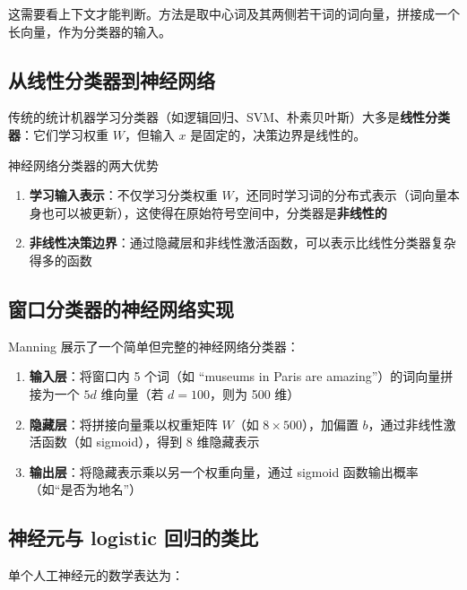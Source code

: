 \documentclass[a4paper]{article}
\begin{document}
这需要看上下文才能判断。方法是取中心词及其两侧若干词的词向量，拼接成一个长向量，作为分类器的输入。

\subsection{从线性分类器到神经网络}

传统的统计机器学习分类器（如逻辑回归、SVM、朴素贝叶斯）大多是\textbf{线性分类器}：它们学习权重 $W$，但输入 $x$ 是固定的，决策边界是线性的。

\begin{importantbox}{神经网络分类器的两大优势}
\begin{enumerate}
    \item \textbf{学习输入表示}：不仅学习分类权重 $W$，还同时学习词的分布式表示（词向量本身也可以被更新），这使得在原始符号空间中，分类器是\textbf{非线性的}
    \item \textbf{非线性决策边界}：通过隐藏层和非线性激活函数，可以表示比线性分类器复杂得多的函数
\end{enumerate}
\end{importantbox}

\subsection{窗口分类器的神经网络实现}

Manning 展示了一个简单但完整的神经网络分类器：

\begin{enumerate}
    \item \textbf{输入层}：将窗口内 5 个词（如 ``museums in Paris are amazing''）的词向量拼接为一个 $5d$ 维向量（若 $d = 100$，则为 500 维）
    \item \textbf{隐藏层}：将拼接向量乘以权重矩阵 $W$（如 $8 \times 500$），加偏置 $b$，通过非线性激活函数（如 sigmoid），得到 8 维隐藏表示
    \item \textbf{输出层}：将隐藏表示乘以另一个权重向量，通过 sigmoid 函数输出概率（如``是否为地名''）
\end{enumerate}

\subsection{神经元与 logistic 回归的类比}





单个人工神经元的数学表达为：
\end{document}
